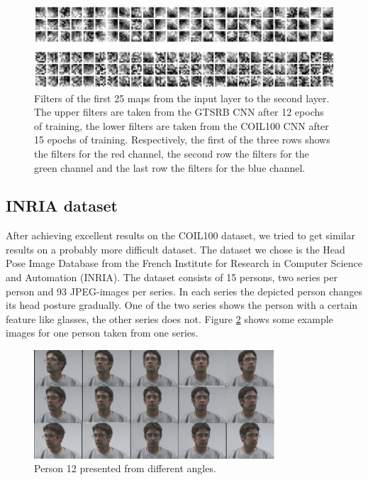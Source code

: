 \documentclass[11pt, a4paper]{article}
\begin{document}
\begin{figure}[h!]
	\centering
	\includegraphics[width=1\textwidth]{gtsrb_vs_coil_filters.png}
	\caption{Filters of the first 25 maps from the input layer to the second layer. The upper filters are taken from the GTSRB CNN after 12 epochs of training, the lower filters are taken from the COIL100 CNN after 15 epochs of training. Respectively, the first of the three rows shows the filters for the red channel, the second row the filters for the green channel and the last row the filters for the blue channel.}
	\label{fig:gtsrb_vs_coil_filters}
\end{figure}


\subsection{INRIA dataset}

After achieving excellent results on the COIL100 dataset, we tried to get similar results on a probably more difficult dataset. The dataset we chose is the Head Pose Image Database \cite{estimating-face-orientation-inria} from the French Institute for Research in Computer Science and Automation (INRIA). The dataset consists of 15 persons, two series per person and 93 JPEG-images per series. In each series the depicted person changes its head posture gradually. One of the two series shows the person with a certain feature like glasses, the other series does not. Figure \ref{fig:inria_different_angles} shows some example images for one person taken from one series.

\begin{figure}[h!]
	\centering
	\includegraphics[width=0.8\textwidth]{inria_different_angles}
	\caption{Person 12 presented from different angles.}
	\label{fig:inria_different_angles}
\end{figure}
\end{document}
